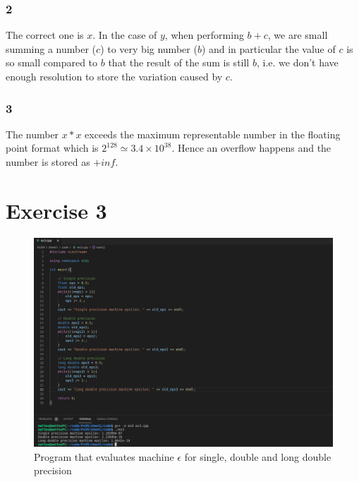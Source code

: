 \documentclass{article}
\begin{document}
\subsubsection*{2}
The correct one is $x$. In the case of $y$, when performing $b+c$, we are small summing a number ($c$) to very big number ($b$) and in particular the value of $c$ is so small compared to $b$ that the result of the sum is still $b$, i.e. we don't have enough resolution to store the variation caused by $c$.
\subsubsection*{3}
The number $x*x$ exceeds the maximum representable number in the floating point format which is $2^{128} \simeq 3.4 \times 10^{38}$. Hence an overflow happens and the number is stored as $+inf$.

\newpage 

\section*{Exercise 3}
\begin{figure}[h]
    \centering 
    \includegraphics[scale=0.35]{pics/machine_eps.png}
    \caption{Program that evaluates machine $\epsilon$ for single, double and long double precision}
    \label{fig:machine_epsilon}
\end{figure}
\end{document}
